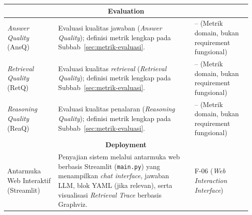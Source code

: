 \begin{longtable}{ p{3.8cm} p{5cm} p{4cm} }
\multicolumn{3}{c}{\textbf{Evaluation}} \\ \hline

\textit{Answer Quality} (AnsQ) &
Evaluasi kualitas jawaban (\textit{Answer Quality}); definisi metrik lengkap pada Subbab~\ref{sec:metrik-evaluasi}. &
-- (Metrik domain, bukan requirement fungsional) \\ \hline

\textit{Retrieval Quality} (RetQ) &
Evaluasi kualitas \textit{retrieval} (\textit{Retrieval Quality}); definisi metrik lengkap pada Subbab~\ref{sec:metrik-evaluasi}. &
-- (Metrik domain, bukan requirement fungsional) \\ \hline

\textit{Reasoning Quality} (ReaQ) &
Evaluasi kualitas penalaran (\textit{Reasoning Quality}); definisi metrik lengkap pada Subbab~\ref{sec:metrik-evaluasi}. &
-- (Metrik domain, bukan requirement fungsional) \\ \hline


\multicolumn{3}{c}{\textbf{Deployment}} \\ \hline

Antarmuka Web Interaktif (Streamlit) &
Penyajian sistem melalui antarmuka web berbasis Streamlit (\texttt{main.py}) yang menampilkan \textit{chat interface}, jawaban LLM, blok YAML (jika relevan), serta visualisasi \textit{Retrieval Trace} berbasis Graphviz. &
F-06 (\textit{Web Interaction Interface}) \\ \hline

\end{longtable}